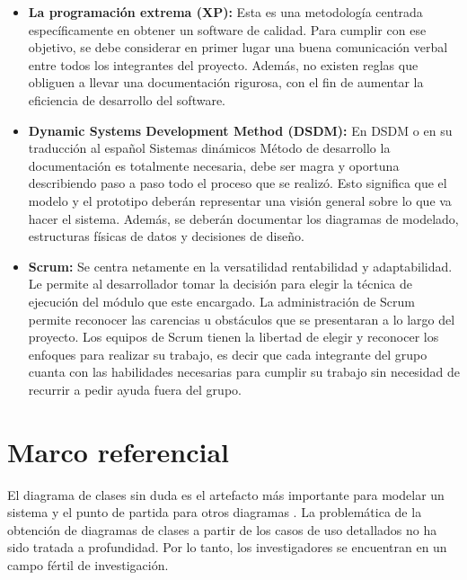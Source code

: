 \begin{itemize}
	\item \textbf{La programación extrema (XP):} Esta es una metodología centrada específicamente en obtener un software de calidad. Para cumplir con ese objetivo, se debe considerar en primer lugar una buena comunicación verbal entre todos los integrantes del proyecto. Además, no existen reglas que obliguen a llevar una documentación rigurosa, con el fin de aumentar la eficiencia de desarrollo del software.
	
	\item \textbf{Dynamic Systems Development Method (DSDM): }En DSDM o en su traducción al español Sistemas dinámicos Método de desarrollo la documentación es totalmente necesaria, debe ser magra y oportuna describiendo paso a paso todo el proceso que se realizó. Esto significa que el modelo y el prototipo deberán representar una visión general sobre lo que va hacer el sistema. Además, se deberán documentar los diagramas de modelado, estructuras físicas de datos y decisiones de diseño.
	
	\item \textbf{Scrum: } Se centra netamente en la versatilidad rentabilidad y adaptabilidad. Le permite al desarrollador tomar la decisión para elegir la técnica de ejecución del módulo que este encargado. La administración de Scrum permite reconocer las carencias u obstáculos que se presentaran a lo largo del proyecto. Los equipos de Scrum tienen la libertad de elegir y reconocer los enfoques para realizar su trabajo, es decir que cada integrante del grupo cuanta con las habilidades necesarias para cumplir su trabajo sin necesidad de recurrir a pedir ayuda fuera del grupo.
\end{itemize}

\section{Marco referencial}

El diagrama de clases sin duda es el artefacto más importante para modelar un sistema y el punto de partida para otros diagramas \cite{Tan2010}. La problemática de la obtención de diagramas de clases a partir de los casos de uso detallados no ha sido tratada a profundidad. Por lo tanto, los investigadores se encuentran en un campo fértil de investigación.

